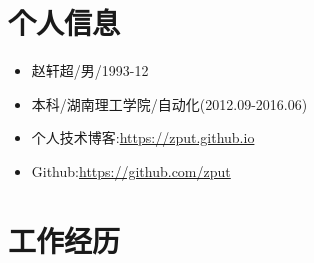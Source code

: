 \documentclass{resume}
\begin{document}


 
\section{个人信息}
\begin{itemize}[parsep=0.2ex]
  \item 赵轩超/男/1993-12
  \item 本科/湖南理工学院/自动化(2012.09-2016.06)
  \item 个人技术博客:\url{https://zput.github.io}
  \item Github:\url{https://github.com/zput}
\end{itemize}

\section{工作经历}
\end{document}
